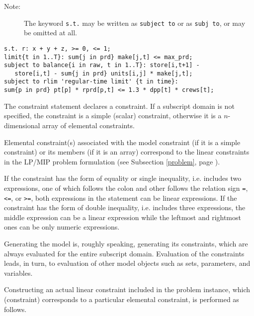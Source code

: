 \documentclass[10pt]{article}
\begin{document}
\begin{description}
\item[{\rm Note:}\hspace*{31pt}] The keyword {\tt s.t.} may be written
as {\tt subject to} or as {\tt subj to}, or may be omitted at all.
\end{description}


\begin{verbatim}
s.t. r: x + y + z, >= 0, <= 1;
limit{t in 1..T}: sum{j in prd} make[j,t] <= max_prd;
subject to balance{i in raw, t in 1..T}: store[i,t+1] -
   store[i,t] - sum{j in prd} units[i,j] * make[j,t];
subject to rlim 'regular-time limit' {t in time}:
sum{p in prd} pt[p] * rprd[p,t] <= 1.3 * dpp[t] * crews[t];
\end{verbatim}

The constraint statement declares a constraint. If a subscript domain
is not specified, the constraint is a simple (scalar) constraint,
otherwise it is a $n$-dimensional array of elemental constraints.

Elemental constraint(s) associated with the model constraint (if it is
a simple constraint) or its members (if it is an array) correspond to
the linear constraints in the LP/MIP problem formulation (see
Subsection \ref{problem}, page \pageref{problem}).

If the constraint has the form of equality or single inequality, i.e.
includes two expressions, one of which follows the colon and other
follows the relation sign {\tt=}, {\tt<=}, or {\tt>=}, both expressions
in the statement can be linear expressions. If the constraint has the
form of double inequality, i.e. includes three expressions, the middle
expression can be a linear expression while the leftmost and rightmost
ones can be only numeric expressions.

Generating the model is, roughly speaking, generating its constraints,
which are always evaluated for the entire subscript domain. Evaluation
of the constraints leads, in turn, to evaluation of other model objects
such as sets, parameters, and variables.

Constructing an actual linear constraint included in the problem
instance, which (constraint) corresponds to a particular elemental
constraint, is performed as follows.
\end{document}
